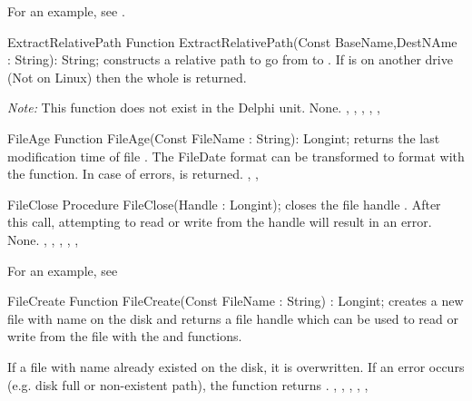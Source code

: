 For an example, see .
 
\begin{function}{ExtractRelativePath}
\Declaration
Function ExtractRelativePath(Const BaseName,DestNAme : String): String;
\Description
{} constructs a relative path to go from
 to . If  is on another drive
(Not on Linux) then the whole  is returned.

{\em Note:} This function does not exist in the Delphi unit.
\Errors
None.
\SeeAlso
{}, , ,
, ,
\end{function}



\begin{function}{FileAge}
\Declaration
Function FileAge(Const FileName : String): Longint;
\Description
{} returns the last modification time of file .
The FileDate format can be transformed to  format with the
 function.
\Errors
In case of errors,  is returned.
\SeeAlso
{}, , 
\end{function}



 
\begin{procedure}{FileClose}
\Declaration
Procedure FileClose(Handle : Longint);
\Description
{} closes the file handle . After this call,
attempting to read or write from the handle will result in an error.
\Errors
None.
\SeeAlso
{}, , , ,
, 
\end{procedure}

For an example, see 

\begin{function}{FileCreate}
\Declaration
Function FileCreate(Const FileName : String) : Longint;
\Description
{} creates a new file with name  on the disk and
returns a file handle which can be used to read or write from the file with
the  and  functions.

If a file with name  already existed on the disk, it is
overwritten.
\Errors
If an error occurs (e.g. disk full or non-existent path), the function
returns .
\SeeAlso
{}, , , ,
, 
\end{function}

